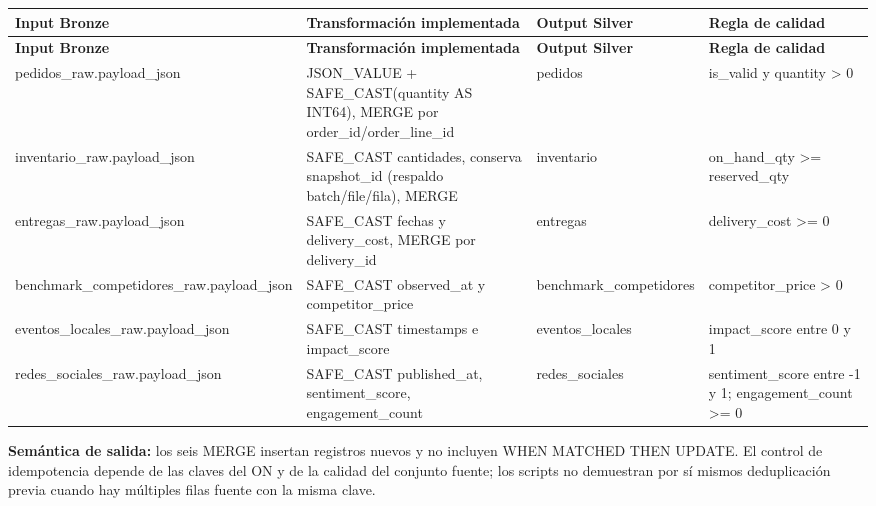 \documentclass[11pt]{article}
\begin{document}
\begingroup\small
\begin{longtable}{@{}>{\raggedright\arraybackslash}p{}>{\raggedright\arraybackslash}p{}>{\raggedright\arraybackslash}p{}>{\raggedright\arraybackslash}p{}@{}}
\toprule
\textbf{Input Bronze} & \textbf{Transformación implementada} & \textbf{Output Silver} & \textbf{Regla de calidad} \\
\midrule
\endfirsthead
\toprule
\textbf{Input Bronze} & \textbf{Transformación implementada} & \textbf{Output Silver} & \textbf{Regla de calidad} \\
\midrule
\endhead
pedidos\_\allowbreak{}raw.payload\_\allowbreak{}json & JSON\_\allowbreak{}VALUE + SAFE\_\allowbreak{}CAST(quantity AS INT64), MERGE por order\_\allowbreak{}id/\allowbreak{}order\_\allowbreak{}line\_\allowbreak{}id & pedidos & is\_\allowbreak{}valid y quantity > 0 \\
inventario\_\allowbreak{}raw.payload\_\allowbreak{}json & SAFE\_\allowbreak{}CAST cantidades, conserva snapshot\_\allowbreak{}id (respaldo batch/file/fila), MERGE & inventario & on\_\allowbreak{}hand\_\allowbreak{}qty >= reserved\_\allowbreak{}qty \\
entregas\_\allowbreak{}raw.payload\_\allowbreak{}json & SAFE\_\allowbreak{}CAST fechas y delivery\_\allowbreak{}cost, MERGE por delivery\_\allowbreak{}id & entregas & delivery\_\allowbreak{}cost >= 0 \\
benchmark\_\allowbreak{}competidores\_\allowbreak{}raw.payload\_\allowbreak{}json & SAFE\_\allowbreak{}CAST observed\_\allowbreak{}at y competitor\_\allowbreak{}price & benchmark\_\allowbreak{}competidores & competitor\_\allowbreak{}price > 0 \\
eventos\_\allowbreak{}locales\_\allowbreak{}raw.payload\_\allowbreak{}json & SAFE\_\allowbreak{}CAST timestamps e impact\_\allowbreak{}score & eventos\_\allowbreak{}locales & impact\_\allowbreak{}score entre 0 y 1 \\
redes\_\allowbreak{}sociales\_\allowbreak{}raw.payload\_\allowbreak{}json & SAFE\_\allowbreak{}CAST published\_\allowbreak{}at, sentiment\_\allowbreak{}score, engagement\_\allowbreak{}count & redes\_\allowbreak{}sociales & sentiment\_\allowbreak{}score entre -1 y 1; engagement\_\allowbreak{}count >= 0 \\
\bottomrule
\end{longtable}
\endgroup

\textbf{Semántica de salida:} los seis MERGE insertan registros nuevos y no incluyen WHEN MATCHED THEN UPDATE. El control de idempotencia depende de las claves del ON y de la calidad del conjunto fuente; los scripts no demuestran por sí mismos deduplicación previa cuando hay múltiples filas fuente con la misma clave.\par
\end{document}
